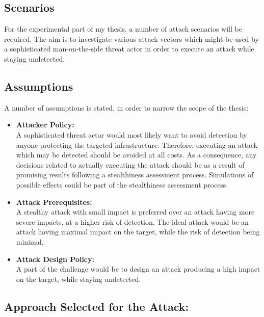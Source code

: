 \subsection{Scenarios}
For the experimental part of my thesis, a number of attack scenarios will be required. The aim is to investigate various attack vectors which might be used by a sophisticated man-on-the-side threat actor in order to execute an attack while staying undetected. 

\subsection{Assumptions} 
A number of assumptions is stated, in order to narrow the scope of the thesis:
\begin{itemize}
    \item \textbf{Attacker Policy:}\\   A sophisticated threat actor would most likely want to avoid detection by anyone protecting the targeted infrastructure.
Therefore, executing an attack which may be detected should be avoided at all costs.
As a consequence, any decisions related to actually executing the attack should be as a result of promising results following a stealthiness assessment process. Simulations of possible effects could be part of the stealthiness assessment process. 
\item \textbf{Attack Prerequisites:}\\   A stealthy attack with small impact is preferred over an attack having more severe impacts, at a higher risk of detection.
The ideal attack would be an attack having maximal impact on the target, while the risk of detection being minimal. 
\item \textbf{Attack Design Policy:}\\   A part of the challenge would be to design an attack producing a high impact on the target, while staying undetected.
\end{itemize}
\subsection{Approach Selected for the Attack:} \label{subsec:Six-Approach}


